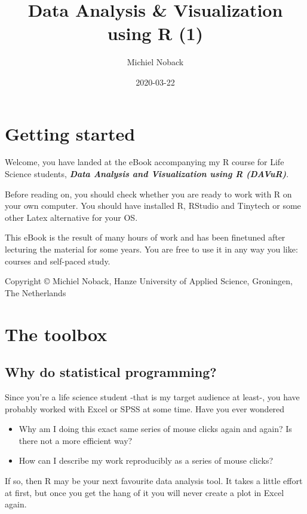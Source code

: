 \documentclass[]{book}
\title{Data Analysis \& Visualization using R (1)}
\author{Michiel Noback}
\date{2020-03-22}
\providecommand{\tightlist}{%
  \setlength{\itemsep}{0pt}\setlength{\parskip}{0pt}}
\begin{document}
\maketitle

{
\setcounter{tocdepth}{1}
\tableofcontents
}
\hypertarget{getting-started}{%
\chapter{Getting started}\label{getting-started}}

Welcome, you have landed at the eBook accompanying my R course for Life Science students, \textbf{\emph{Data Analysis and Visualization using R (DAVuR)}}.

Before reading on, you should check whether you are ready to work with R on your own computer.
You should have installed R, RStudio and Tinytech or some other Latex alternative for your OS.

This eBook is the result of many hours of work and has been finetuned after lecturing the material for some years.
You are free to use it in any way you like: courses and self-paced study.

Copyright © Michiel Noback, Hanze University of Applied Science, Groningen, The Netherlands

\hypertarget{toolbox}{%
\chapter{The toolbox}\label{toolbox}}

\hypertarget{why-do-statistical-programming}{%
\section{Why do statistical programming?}\label{why-do-statistical-programming}}

Since you're a life science student -that is my target audience at least-, you have probably worked with Excel or SPSS at some time. Have you ever wondered

\begin{itemize}
\tightlist
\item
  Why am I doing this exact same series of mouse clicks again and again? Is there not a more efficient way?
\item
  How can I describe my work reproducibly as a series of mouse clicks?
\end{itemize}

If so, then R may be your next favourite data analysis tool.
It takes a little effort at first, but once you get the hang of it you will never create a plot in Excel again.
\end{document}
